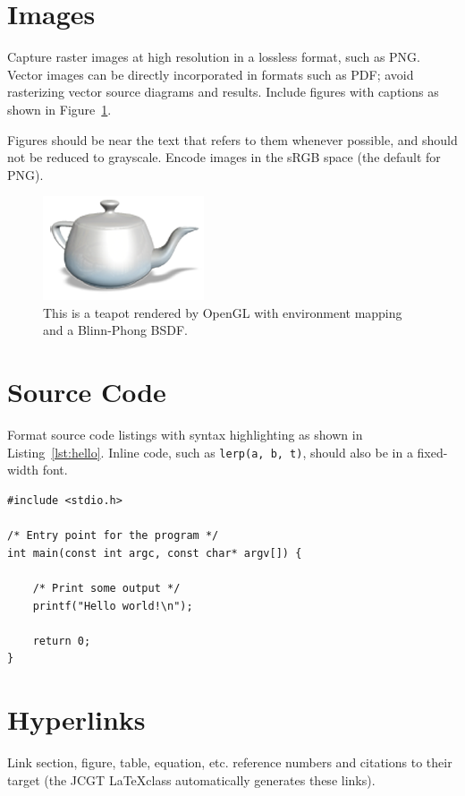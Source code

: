 \documentclass{jcgt}
\begin{document}
\section{Images}

Capture raster images at high resolution in a lossless format, such as PNG.  Vector images
can be directly incorporated in formats such as PDF; avoid rasterizing vector source diagrams
and results.  Include figures with captions as shown in Figure~\ref{fig:teapot}.

Figures should be near the text that refers to them whenever possible, and should not be
reduced to grayscale.  Encode images in the sRGB space (the default for PNG).

\begin{figure}[htb]
  \centering
   \includegraphics[width=0.5\columnwidth]{teapot.png}
   \caption{\label{fig:teapot}
     This is a teapot rendered by OpenGL with environment mapping and a Blinn-Phong BSDF.}
\end{figure}

\section{Source Code}

Format source code listings with syntax highlighting as shown in Listing~\ref{lst:hello}.  Inline
code, such as \lstinline{lerp(a, b, t)}, should also be in a fixed-width font.

\begin{lstlisting}[caption={A simple C program.}, label={lst:hello}, float]
#include <stdio.h>

/* Entry point for the program */
int main(const int argc, const char* argv[]) {

    /* Print some output */
    printf("Hello world!\n");

    return 0;
}
\end{lstlisting}

\section{Hyperlinks}
Link section, figure, table, equation, etc. reference numbers and citations to their target (the JCGT \LaTeX class automatically generates these links).
\end{document}
